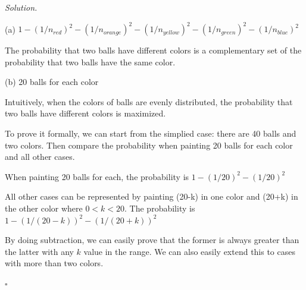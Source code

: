 \documentclass[11pt]{article}
\theoremstyle{definition}
\newenvironment{solution}{\noindent\emph{Solution.}}{\hfill$\square$}
\begin{document}
\begin{solution}

(a) $1 - (1/n_{red})^2 - (1/n_{orange})^2 - (1/n_{yellow})^2 - (1/n_{green})^2 - (1/n_{blue})^2$

The probability that two balls have different colors is a complementary set of the probability that two balls have the same color.


(b) 20 balls for each color

Intuitively, when the colors of balls are evenly distributed, the probability that two balls have different colors is maximized.

To prove it formally, we can start from the simplied case: there are 40 balls
and two colors. Then compare the probability when painting 20 balls for each
color and all other cases.

When painting 20 balls for each, the probability is $1 - (1/20)^2 - (1/20)^2$

All other cases can be represented by painting (20-k) in one color and (20+k)
in the other color where $0<k<20$. The probability is $1 - (1/(20-k))^2 -
(1/(20+k))^2$

By doing subtraction, we can easily prove that the former is always greater
than the latter with any $k$ value in the range. We can also easily extend this 
to cases with more than two colors.

\end{solution}



\end{document}
